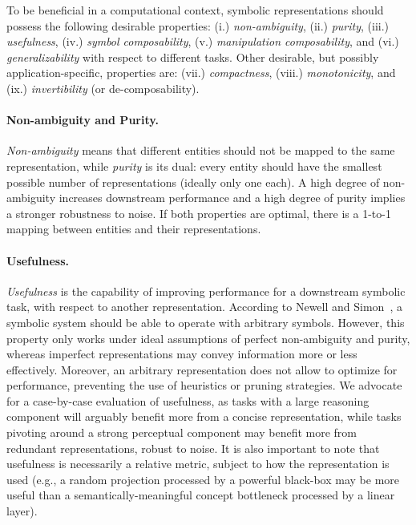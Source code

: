 To be beneficial in a computational context, symbolic representations should possess the following desirable properties: (i.) \textit{non-ambiguity}, (ii.) \textit{purity}, (iii.) \textit{usefulness}, (iv.) \textit{symbol composability}, (v.) \textit{manipulation composability}, and (vi.) \textit{generalizability} with respect to different tasks.
Other desirable, but possibly application-specific, properties are: (vii.) \textit{compactness}, (viii.) \textit{monotonicity}, and (ix.) \textit{invertibility} (or de-composability).

\paragraph{Non-ambiguity and Purity.} \textit{Non-ambiguity} means that different entities should not be mapped to the same representation, while \textit{purity} is its dual: every entity should have the smallest possible number of representations (ideally only one each). A high degree of non-ambiguity increases downstream performance and a high degree of purity implies a stronger robustness to noise. If both properties are optimal, there is a 1-to-1 mapping between entities and their representations.

\paragraph{Usefulness.} \textit{Usefulness} is the capability of improving performance for a downstream symbolic task, with respect to another representation. According to Newell and Simon~\cite{newell1972human}, a symbolic system should be able to operate with arbitrary symbols. However, this property only works under ideal assumptions of perfect non-ambiguity and purity, whereas imperfect representations may convey information more or less effectively. Moreover, an arbitrary representation does not allow to optimize for performance, preventing the use of heuristics or pruning strategies.
We advocate for a case-by-case evaluation of usefulness, as tasks with a large reasoning component will arguably benefit more from a concise representation, while tasks pivoting around a strong perceptual component may benefit more from redundant representations, robust to noise. It is also important to note that usefulness is necessarily a relative metric, subject to how the representation is used (e.g., a random projection processed by a powerful black-box may be more useful than a semantically-meaningful concept bottleneck processed by a linear layer). %

